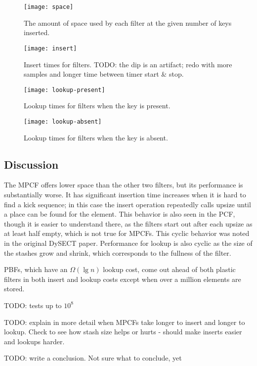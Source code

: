 \documentclass[letterpaper, 11pt]{article}
\begin{document}
\begin{figure}
  \texttt{[image: space]}
  \caption{
    The amount of space used by each filter at the given number of keys inserted.
  }
\end{figure}


\begin{figure}
  \texttt{[image: insert]}
  \caption{
    Insert times for filters.
TODO: the dip is an artifact; redo with more samples and longer time between timer start \& stop.
  }
\end{figure}

\begin{figure}
  \texttt{[image: lookup-present]}
  \caption{
    Lookup times for filters when the key is present.
  }
\end{figure}

\begin{figure}
  \texttt{[image: lookup-absent]}
  \caption{
    Lookup times for filters when the key is absent.
  }
\end{figure}

\subsection{Discussion}

The MPCF offers lower space than the other two filters, but its performance is substantially worse.
It has significant insertion time increases when it is hard to find a kick sequence; in this case the insert operation repeatedly calls upsize until a place can be found for the element.
This behavior is also seen in the PCF, though it is easier to understand there, as the filters start out after each upsize as at least half empty, which is not true for MPCFs.
This cyclic behavior was noted in the original DySECT paper. \cite{dysect}
Performance for lookup is also cyclic as the size of the stashes grow and shrink, which corresponds to the fullness of the filter.

PBFs, which have an $\Omega(\lg n)$ lookup cost, come out ahead of both plastic filters in both insert and lookup costs except when over a million elements are stored.

TODO: tests up to $10^8$

TODO: explain in more detail when MPCFs take longer to insert and longer to lookup. Check to see how stash size helps or hurts - should make inserts easier and lookups harder.

TODO: write a conclusion. Not sure what to conclude, yet
\end{document}
